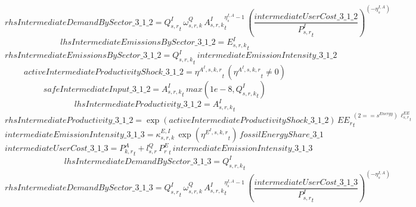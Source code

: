 \begin{dmath*}
rhsIntermediateDemandBySector\_3\_1\_2 = {{Q^{I}_{s,r}}}_{t}\, {{\omega^{Q}_{s,r,k}}}\, {{A^{I}_{s,r,k}}}_{t}^{{{\eta^{I,A}_{s}}}-1}\, \left(\frac{{intermediateUserCost\_3\_1\_2}}{{{P^{I}_{s,r}}}_{t}}\right)^{\left(-{{\eta^{I,A}_{s}}}\right)}
\end{dmath*}
\begin{dmath*}
lhsIntermediateEmissionsBySector\_3\_1\_2 = {{E^I_{s,r,k}}}_{t}
\end{dmath*}
\begin{dmath*}
rhsIntermediateEmissionsBySector\_3\_1\_2 = {{Q^{I}_{s,r,k}}}_{t}\, {intermediateEmissionIntensity\_3\_1\_2}
\end{dmath*}
\begin{dmath*}
activeIntermediateProductivityShock\_3\_1\_2 = {{\eta^{A^{I},s,k,r}}}_{t}\, \left({{\eta^{A^{I},s,k,r}}}_{t}\neq 0\right)
\end{dmath*}
\begin{dmath*}
safeIntermediateInput\_3\_1\_2 = {{A^{I}_{s,r,k}}}_{t}\, max(1e-8,{{Q^{I}_{s,r,k}}}_{t})
\end{dmath*}
\begin{dmath*}
lhsIntermediateProductivity\_3\_1\_2 = {{A^{I}_{s,r,k}}}_{t}
\end{dmath*}
\begin{dmath*}
rhsIntermediateProductivity\_3\_1\_2 = \exp\left({activeIntermediateProductivityShock\_3\_1\_2}\right)\, {{EE_r}}_{t}^{\left(2=={{s^{Energy}}}\right)\, {{\ell^{EE}_{s,r}}}_{t}}
\end{dmath*}
\begin{dmath*}
intermediateEmissionIntensity\_3\_1\_3 = {{\kappa^{E,I}_{s,r,k}}}\, \exp\left({{\eta^{E^{I},s,k,r}}}_{t}\right)\, {fossilEnergyShare\_3\_1}
\end{dmath*}
\begin{dmath*}
intermediateUserCost\_3\_1\_3 = {{P^{A}_{k,r}}}_{t}+{{l^{Q}_{s,r}}}\, {{P^E_r}}_{t}\, {intermediateEmissionIntensity\_3\_1\_3}
\end{dmath*}
\begin{dmath*}
lhsIntermediateDemandBySector\_3\_1\_3 = {{Q^{I}_{s,r,k}}}_{t}
\end{dmath*}
\begin{dmath*}
rhsIntermediateDemandBySector\_3\_1\_3 = {{Q^{I}_{s,r}}}_{t}\, {{\omega^{Q}_{s,r,k}}}\, {{A^{I}_{s,r,k}}}_{t}^{{{\eta^{I,A}_{s}}}-1}\, \left(\frac{{intermediateUserCost\_3\_1\_3}}{{{P^{I}_{s,r}}}_{t}}\right)^{\left(-{{\eta^{I,A}_{s}}}\right)}
\end{dmath*}
